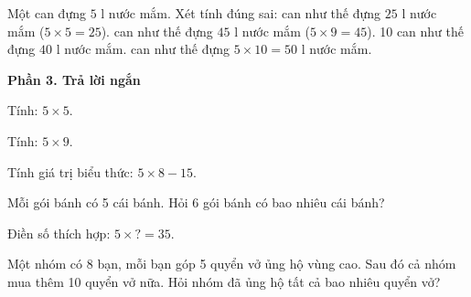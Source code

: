 \begin{ex} %
Một can đựng $5\text{ l}$ nước mắm. Xét tính đúng sai:
\choiceTF
{ can như thế đựng $25\text{ l}$ nước mắm ($5 \times 5 = 25$).}
{ can như thế đựng $45\text{ l}$ nước mắm ($5 \times 9 = 45$).}
{10 can như thế đựng $40\text{ l}$ nước mắm.}
{ can như thế đựng $5 \times 10 = 50\text{ l}$ nước mắm.}
\end{ex}

\textbf{Phần 3. Trả lời ngắn}

\begin{ex} %
Tính: $5 \times 5$.
\end{ex}

\begin{ex} %
Tính: $5 \times 9$.
\end{ex}

\begin{ex} %
Tính giá trị biểu thức: $5 \times 8 - 15$.
\end{ex}

\begin{ex} %
Mỗi gói bánh có 5 cái bánh. Hỏi 6 gói bánh có bao nhiêu cái bánh?
\end{ex}

\begin{ex} %
Điền số thích hợp: $5 \times ? = 35$.
\end{ex}

\begin{ex} %
Một nhóm có 8 bạn, mỗi bạn góp 5 quyển vở ủng hộ vùng cao. Sau đó cả nhóm mua thêm 10 quyển vở nữa. Hỏi nhóm đã ủng hộ tất cả bao nhiêu quyển vở?
\end{ex}
